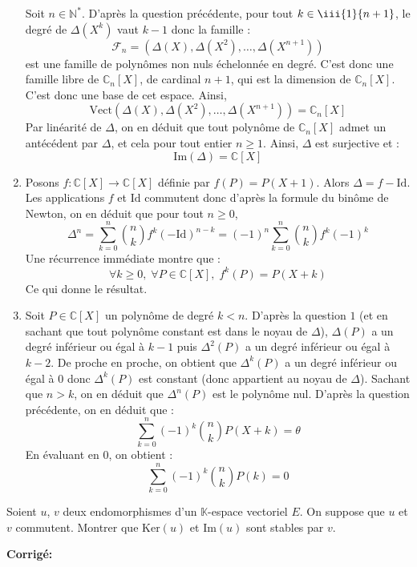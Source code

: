 \documentclass[a4paper,twoside,french,11pt]{VcCours}
\newcommand{\corr}{\textbf{Corrigé:}}
\begin{document}
\begin{enumerate}
\noindent Soit $n \in \mathbb{N}^*$. D'après la question précédente, pour tout $k \in \iii{1}{n+1}$, le degré de $\Delta(X^k)$ vaut $k-1$ donc la famille :
$$ \mathcal{F}_n = (\Delta(X), \Delta(X^2), \ldots, \Delta(X^{n+1}))$$
 est une famille de polynômes non nuls échelonnée en degré. C'est donc une famille libre de $\mathbb{C}_n[X]$, de cardinal $n+1$, qui est la dimension de $\mathbb{C}_n[X]$. C'est donc une base de cet espace. Ainsi,
 $$ \textrm{Vect}(\Delta(X), \Delta(X^2), \ldots, \Delta(X^{n+1})) = \mathbb{C}_n[X]$$
 Par linéarité de $\Delta$, on en déduit que tout polynôme de $\mathbb{C}_n[X]$ admet un antécédent par $\Delta$, et cela pour tout entier $n \geq 1$. Ainsi, $\Delta$ est surjective et :
 $$ \textrm{Im}(\Delta) = \mathbb{C}[X]$$
 \item Posons $f : \mathbb{C}[X] \rightarrow \mathbb{C}[X]$ définie par $f(P)=P(X+1)$. Alors $\Delta = f - \textrm{Id}$. Les applications $f$ et $\textrm{Id}$ commutent donc d'après la formule du binôme de Newton, on en déduit que pour tout $n \geq 0$,
 $$ \Delta^n = \sum_{k=0}^n \binom{n}{k} f^k (- \textrm{Id})^{n-k}  = (-1)^n \sum_{k=0}^n \binom{n}{k} f^k (-1)^k$$
 Une récurrence immédiate montre que :
 $$ \forall k \geq 0, \; \forall P \in \mathbb{C}[X], \; f^k (P)= P(X+k)$$
 Ce qui donne le résultat.
 \item Soit $P \in \mathbb{C}[X]$ un polynôme de degré $k <n$. D'après la question $1$ (et en sachant que tout polynôme constant est dans le noyau de $\Delta$), $\Delta(P)$ a un degré inférieur ou égal à $k-1$ puis $\Delta^2(P)$ a un degré inférieur ou égal à $k-2$. De proche en proche, on obtient que $\Delta^k(P)$ a un degré inférieur ou égal à $0$ donc $\Delta^k(P)$ est constant (donc appartient au noyau de $\Delta$). Sachant que $n>k$, on en déduit que $\Delta^n(P)$ est le polynôme nul. D'après la question précédente, on en déduit que :
$$\sum_{k = 0}^{n} ( - 1)^{k} \binom{n}{k}P(X + k) = \theta$$
 En évaluant en $0$, on obtient :
 $$ \sum_{k = 0}^{n} ( - 1)^{k} \binom{n}{k}P(k) = 0$$
\end{enumerate}



\begin{Exercice}{} Soient $u$, $v$ deux endomorphismes d'un $\mathbb{K}$-espace vectoriel $E$. On suppose que $u$ et $v$ commutent. Montrer que $\textrm{Ker}(u)$ et $\textrm{Im}(u)$ sont stables par $v$.
\end{Exercice} 

\corr 
\end{document}
